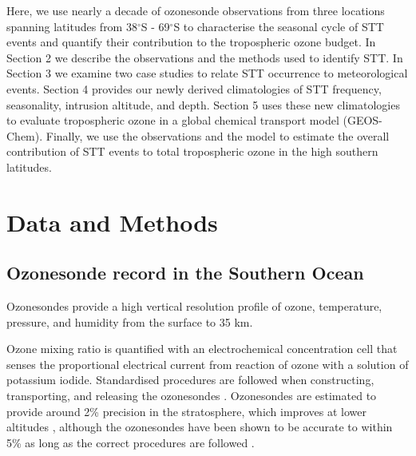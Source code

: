 \documentclass{article}
\begin{document}

    Here, we use nearly a decade of ozonesonde observations from three locations spanning latitudes from 38$^{\circ}$S - 69$^{\circ}$S to characterise the seasonal cycle of STT events and quantify their contribution to the tropospheric ozone budget. 
    In Section 2 we describe the observations and the methods used to identify STT. 
    In Section 3 we examine two case studies to relate STT occurrence to meteorological events.
    Section 4 provides our newly derived climatologies of STT frequency, seasonality, intrusion altitude, and depth. 
    Section 5 uses these new climatologies to evaluate tropospheric ozone in a global chemical transport model (GEOS-Chem). 
    Finally, we use the observations and the model to estimate the overall contribution of STT events to total tropospheric ozone in the high southern latitudes.

\section{Data and Methods}

  \subsection{Ozonesonde record in the Southern Ocean}
    Ozonesondes provide a high vertical resolution profile of ozone, temperature, pressure, and humidity from the surface to 35 km.
    
    Ozone mixing ratio is quantified with an electrochemical concentration cell that senses the proportional electrical current from reaction of ozone with a solution of potassium iodide.
    Standardised procedures are followed when constructing, transporting, and releasing the ozonesondes \citep{noaasondes}.
    Ozonesondes are estimated to provide around 2\% precision in the stratosphere, which improves at lower altitudes \citep{noaasondes}, although the ozonesondes have been shown to be accurate to within 5\% as long as the correct procedures are followed \citep{Smit2007}.
    
\end{document}
